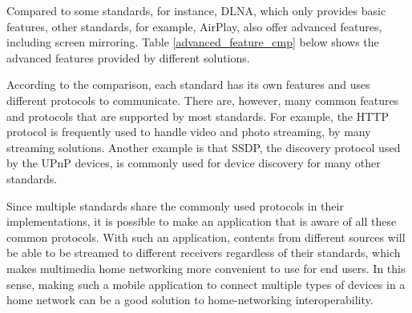 Compared to some standards, for instance, DLNA, which only provides basic
features, other standards, for example, AirPlay, also offer advanced features,
including screen mirroring. Table \ref{advanced_feature_cmp} below shows the
advanced features provided by different solutions.

\begin{table}[htb] 
\caption{Advanced feature comparison \label{advanced_feature_cmp}} 
\begin{center} 
\end{center} 
\end{table} 

According to the comparison, each standard has its own features and uses 
different protocols to communicate. There are, however, many common features
and protocols that are supported by most standards. For example, the HTTP
protocol is frequently used to handle video and photo streaming, by many
streaming solutions. Another example is that SSDP, the discovery protocol used
by the UPnP devices, is commonly used for device discovery for many other
standards.

Since multiple standards share the commonly used protocols in their
implementations, it is possible to make an application that is aware of all
these common protocols. With such an application, contents from
different sources will be able to be streamed to different receivers regardless
of their standards, which makes multimedia home networking more convenient to
use for end users. In this sense, making such a mobile application to connect
multiple types of devices in a home network can be a good solution to home-networking
interoperability.

